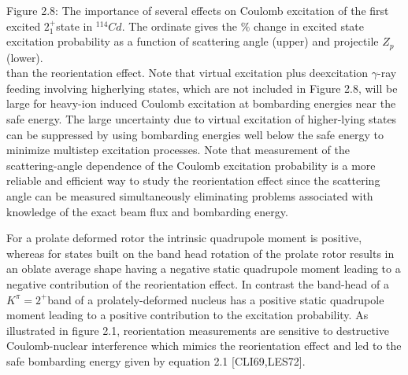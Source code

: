 \documentclass[10pt]{article}
\begin{document}
Figure 2.8: The importance of several effects on Coulomb excitation of the first excited $2_{1}^{+}$state in ${ }^{114} C d$. The ordinate gives the $\%$ change in excited state excitation probability as a function of scattering angle (upper) and projectile $Z_{p}$ (lower).\\
than the reorientation effect. Note that virtual excitation plus deexcitation $\gamma$-ray feeding involving higherlying states, which are not included in Figure 2.8, will be large for heavy-ion induced Coulomb excitation at bombarding energies near the safe energy. The large uncertainty due to virtual excitation of higher-lying states can be suppressed by using bombarding energies well below the safe energy to minimize multistep excitation processes. Note that measurement of the scattering-angle dependence of the Coulomb excitation probability is a more reliable and efficient way to study the reorientation effect since the scattering angle can be measured simultaneously eliminating problems associated with knowledge of the exact beam flux and bombarding energy.

For a prolate deformed rotor the intrinsic quadrupole moment is positive, whereas for states built on the band head rotation of the prolate rotor results in an oblate average shape having a negative static quadrupole moment leading to a negative contribution of the reorientation effect. In contrast the band-head of a $K^{\pi}=2^{+}$band of a prolately-deformed nucleus has a positive static quadrupole moment leading to a positive contribution to the excitation probability. As illustrated in figure 2.1, reorientation measurements are sensitive to destructive Coulomb-nuclear interference which mimics the reorientation effect and led to the safe bombarding energy given by equation 2.1 [CLI69,LES72].
\end{document}
